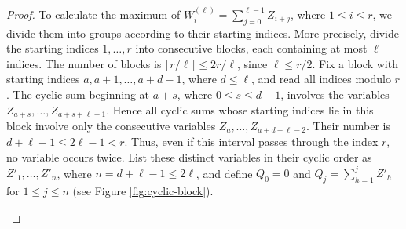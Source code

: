\documentclass[12pt,a4paper]{article}
\numberwithin{equation}{section}
\theoremstyle{definition}
\theoremstyle{remark}
\begin{document}
\begin{proof}
To calculate the maximum of
$W_i^{(\ell)}=\sum_{j=0}^{\ell-1}Z_{i+j}$, where $1\le i\le r$, we divide them into groups according to their starting indices.  More precisely, divide the starting indices $1,\ldots,r$ into consecutive blocks, each containing at most $\ell$ indices.  The number of blocks is
$\lceil r/\ell\rceil\le2r/\ell$, since $\ell\le r/2$.  Fix a block with starting indices
$a,a+1,\ldots,a+d-1$, where $d\le\ell$, and read all indices modulo $r$.  The cyclic sum beginning at $a+s$, where $0\le s\le d-1$, involves the variables
$Z_{a+s},\ldots,Z_{a+s+\ell-1}$.  Hence all cyclic sums whose starting indices lie in this block involve only the consecutive variables
$Z_a,\ldots,Z_{a+d+\ell-2}$.
Their number is $d+\ell-1\le2\ell-1<r$.  Thus, even if this interval passes through the index $r$, no variable occurs twice.  List these distinct variables in their cyclic order as $Z'_1,\ldots,Z'_n$, where
$n=d+\ell-1\le2\ell$, and define
$Q_0=0$ and $Q_j=\sum_{h=1}^jZ'_h$ for $1\le j\le n$ (see Figure \ref{fig:cyclic-block}).



\begin{figure}[htbp]
\centering
{}
\end{figure}
\end{proof}
\end{document}

